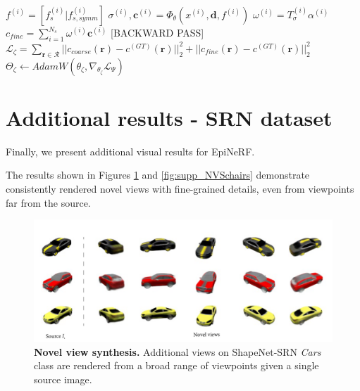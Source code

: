 \begin{algorithm}[htbp]
{{        $f^{(i)} = [f_{s}^{(i)} | f_{s,symm}^{(i)}]$
        $\sigma^{(i)},\mathbf{c}^{(i)} = \Phi_{\theta}(x^{(i)},\mathbf{d},f^{(i)})$ 
        $\omega^{(i)} = T_{\sigma}^{(i)}\alpha^{(i)}$ 
        }
        $c_{fine} = \sum_{i=1}^{N_{s}}\omega^{(i)}\textbf{c}^{(i)}$ 
  \;
  \textcolor{red!50}{[BACKWARD PASS]}\;
    $\mathcal{L}_{\zeta}= \sum_{\mathbf{r}\in\mathcal{R}} || c_{coarse}(\mathbf{r}) - c^{(GT)}(\mathbf{r}) ||_{2}^{2} +|| c_{fine}(\mathbf{r}) - c^{(GT)}(\mathbf{r}) ||_{2}^{2}$
    $\Theta_{\zeta} \gets AdamW(\theta_{\zeta},\nabla_{\theta_{\zeta}} \mathcal{L}_{\Psi})$ 
    }
\end{algorithm}


\section{Additional results - SRN dataset }

Finally, we present additional visual results for EpiNeRF.

The results shown in Figures \ref{fig:supp_NVScars} and \ref{fig:supp_NVSchairs} demonstrate consistently rendered novel views with fine-grained details, even from viewpoints far from the source. 

\begin{figure}[htp!]
   \begin{center}
  \includegraphics[width=\linewidth]{images/epinerf/supp_NVS_Cars.png}
  \caption{\textbf{Novel view synthesis.} Additional views on ShapeNet-SRN \textit{Cars} class are rendered from a broad range of viewpoints given a single source image. }
  \label{fig:supp_NVScars}
  \end{center}
\end{figure}


